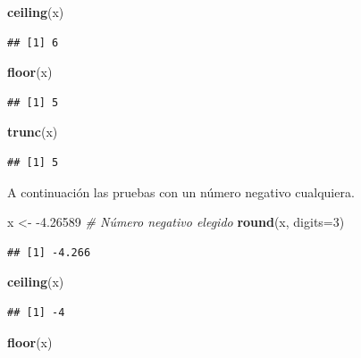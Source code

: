\documentclass[10pt,]{krantz}
\makeatletter
\newenvironment{Shaded}{\begin{snugshade}}{\end{snugshade}}
\newcommand{\KeywordTok}[1]{\textcolor[rgb]{0.13,0.29,0.53}{\textbf{{#1}}}}
\newcommand{\DataTypeTok}[1]{\textcolor[rgb]{0.13,0.29,0.53}{{#1}}}
\newcommand{\DecValTok}[1]{\textcolor[rgb]{0.00,0.00,0.81}{{#1}}}
\newcommand{\FloatTok}[1]{\textcolor[rgb]{0.00,0.00,0.81}{{#1}}}
\newcommand{\StringTok}[1]{\textcolor[rgb]{0.31,0.60,0.02}{{#1}}}
\newcommand{\CommentTok}[1]{\textcolor[rgb]{0.56,0.35,0.01}{\textit{{#1}}}}
\newcommand{\NormalTok}[1]{{#1}}
\newenvironment{kframe}{%
\medskip{}
\setlength{\fboxsep}{.8em}
 \def\at@end@of@kframe{}%
 \ifinner\ifhmode%
  \def\at@end@of@kframe{\end{minipage}}%
  \begin{minipage}{\columnwidth}%
 \fi\fi%
 \def\FrameCommand##1{\hskip\@totalleftmargin \hskip-\fboxsep
 \colorbox{shadecolor}{##1}\hskip-\fboxsep
     \hskip-\linewidth \hskip-\@totalleftmargin \hskip\columnwidth}%
 \MakeFramed {\advance\hsize-\width
   \@totalleftmargin\z@ \linewidth\hsize
   \@setminipage}}%
 {\par\unskip\endMakeFramed%
 \at@end@of@kframe}
\renewenvironment{Shaded}{\begin{kframe}}{\end{kframe}}
\makeatother
\begin{document}
\begin{Shaded}
\begin{Highlighting}[]
\KeywordTok{ceiling}\NormalTok{(x)}
\end{Highlighting}
\end{Shaded}

\begin{verbatim}
## [1] 6
\end{verbatim}

\begin{Shaded}
\begin{Highlighting}[]
\KeywordTok{floor}\NormalTok{(x)}
\end{Highlighting}
\end{Shaded}

\begin{verbatim}
## [1] 5
\end{verbatim}

\begin{Shaded}
\begin{Highlighting}[]
\KeywordTok{trunc}\NormalTok{(x)}
\end{Highlighting}
\end{Shaded}

\begin{verbatim}
## [1] 5
\end{verbatim}

A continuación las pruebas con un número negativo cualquiera.

\begin{Shaded}
\begin{Highlighting}[]
\NormalTok{x <-}\StringTok{ }\NormalTok{-}\FloatTok{4.26589}  \CommentTok{# Número negativo elegido}
\KeywordTok{round}\NormalTok{(x, }\DataTypeTok{digits=}\DecValTok{3}\NormalTok{)}
\end{Highlighting}
\end{Shaded}

\begin{verbatim}
## [1] -4.266
\end{verbatim}

\begin{Shaded}
\begin{Highlighting}[]
\KeywordTok{ceiling}\NormalTok{(x)}
\end{Highlighting}
\end{Shaded}

\begin{verbatim}
## [1] -4
\end{verbatim}

\begin{Shaded}
\begin{Highlighting}[]
\KeywordTok{floor}\NormalTok{(x)}
\end{Highlighting}
\end{Shaded}
\end{document}
